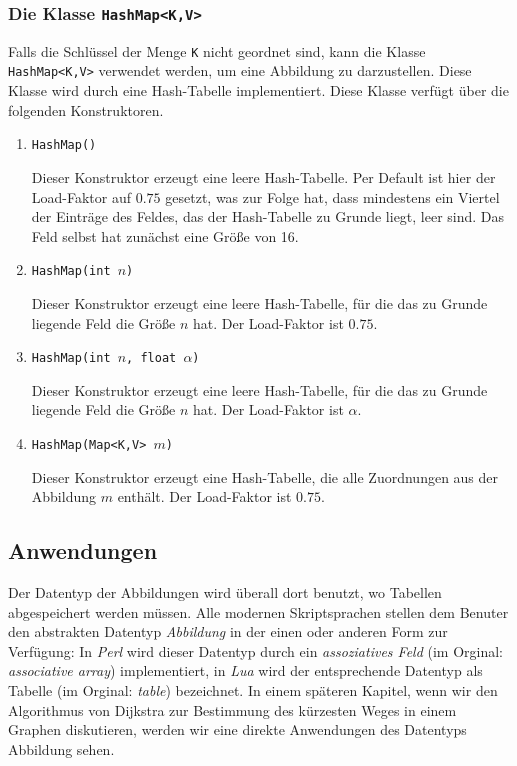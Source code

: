 \subsubsection{Die Klasse \texttt{HashMap<K,V>}} 
Falls die Schl\"ussel der Menge \texttt{K} nicht geordnet sind, kann die Klasse
\texttt{HashMap<K,V>} verwendet werden, um eine Abbildung zu darzustellen.  Diese Klasse
wird durch eine Hash-Tabelle implementiert. Diese Klasse verf\"ugt \"uber die folgenden Konstruktoren.
\begin{enumerate}
\item \texttt{HashMap()}
  
      Dieser Konstruktor erzeugt eine leere Hash-Tabelle.  Per Default ist
      hier der Load-Faktor auf $0.75$ gesetzt, was zur Folge hat, dass mindestens
      ein Viertel der Eintr\"age des Feldes, das der Hash-Tabelle zu Grunde liegt,
      leer sind.  Das Feld selbst hat zun\"achst eine Gr\"o{\ss}e von 16.
\item \texttt{HashMap(int $n$)}
  
      Dieser Konstruktor erzeugt eine leere Hash-Tabelle, f\"ur die das zu Grunde
      liegende Feld die Gr\"o{\ss}e $n$ hat.  Der Load-Faktor ist $0.75$.
\item \texttt{HashMap(int $n$, float $\alpha$)}

      Dieser Konstruktor erzeugt eine leere Hash-Tabelle, f\"ur die das zu Grunde
      liegende Feld die Gr\"o{\ss}e $n$ hat.  Der Load-Faktor ist $\alpha$.
\item \texttt{HashMap(Map<K,V> $m$)}

      Dieser Konstruktor erzeugt eine Hash-Tabelle, die alle Zuordnungen aus der
      Abbildung $m$ enth\"alt.  Der Load-Faktor ist $0.75$.
\end{enumerate}

\subsection{Anwendungen}
Der Datentyp der Abbildungen wird \"uberall dort benutzt, wo Tabellen abgespeichert werden
m\"ussen.  Alle modernen Skriptsprachen stellen dem Benuter den abstrakten Datentyp
\emph{Abbildung} in der einen oder anderen Form zur Verf\"ugung:  In \textsl{Perl}
\cite{Wall92} wird
dieser Datentyp durch ein \emph{assoziatives Feld} (im Orginal: \emph{associative array})
implementiert, in \textsl{Lua} \cite{ierusalimschy:2006,Ieru96a} 
wird der entsprechende Datentyp als Tabelle (im Orginal:
\emph{table}) bezeichnet.
In einem sp\"ateren Kapitel, wenn wir den Algorithmus von Dijkstra zur Bestimmung
des k\"urzesten Weges in einem 
Graphen diskutieren, werden wir eine direkte Anwendungen des Datentyps Abbildung sehen.



